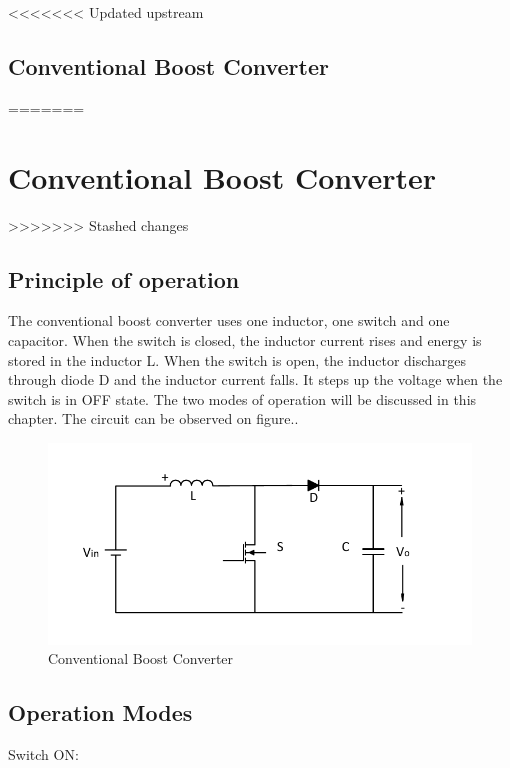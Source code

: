 <<<<<<< Updated upstream
\section{Conventional Boost Converter}\label{ch:CBC}
=======
\chapter{Conventional Boost Converter}\label{ch:CBC}
>>>>>>> Stashed changes

\section{Principle of operation}\label{sec:SON}

The conventional boost converter uses one inductor,
one switch and one capacitor. When the switch is closed, the inductor current rises and energy is stored in the inductor L. When the switch is open, the inductor discharges through diode D and the inductor current falls. It steps up the voltage when
the switch is in OFF state. The two modes of operation will be discussed in this chapter. The circuit can be observed on figure..


\begin{figure}[H]
   \centering
   \includegraphics[width=\textwidth]{figures/aConventionalBoost/ConventionalBoostConverter.pdf}
    \caption{Conventional Boost Converter}
	\label{fig:ConventionalBoost}
\end{figure}

\section{Operation Modes}\label{sec:SON}

Switch ON:

